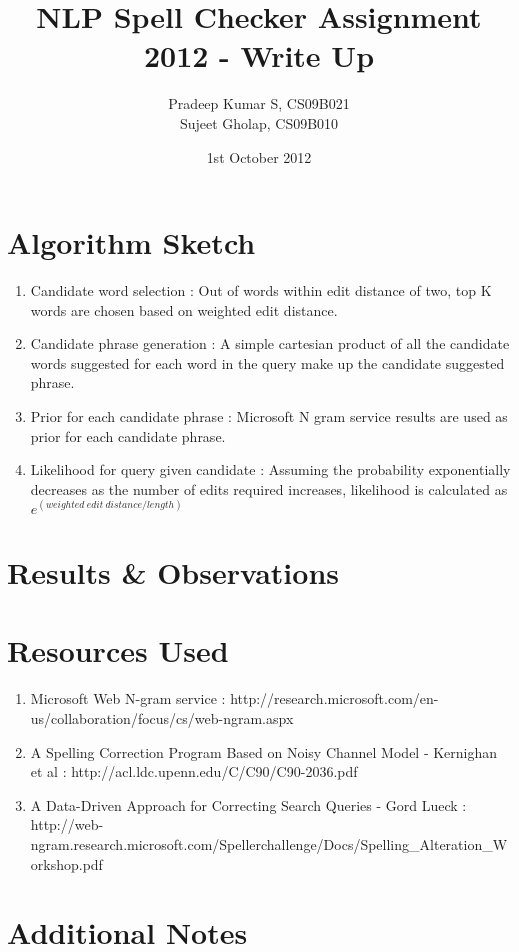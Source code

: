 \documentclass{article}
\title{NLP Spell Checker Assignment 2012 - Write Up}
\author{Pradeep Kumar S, CS09B021\\
Sujeet Gholap, CS09B010
}
\date{1st October 2012}
\begin{document}
\maketitle



\section{Algorithm Sketch}
\begin{enumerate}
\item Candidate word selection : Out of words within edit distance of two,
top K words are chosen based on weighted edit distance.
\item Candidate phrase generation : A simple cartesian product of all the
candidate words suggested for each word in the query make up the candidate
suggested phrase.
\item Prior for each candidate phrase : Microsoft N gram service results are
used as prior for each candidate phrase.
\item Likelihood for query given candidate : Assuming the probability
exponentially decreases as the number of edits required increases, likelihood
is calculated as $e^{(weighted\ edit\ distance / length)}$
\end{enumerate}


\section{Results \& Observations}


\section{Resources Used}
\begin{enumerate}
\item Microsoft Web N-gram service : http://research.microsoft.com/en-us/collaboration/focus/cs/web-ngram.aspx
\item A Spelling Correction Program Based on Noisy Channel Model - Kernighan
et al : http://acl.ldc.upenn.edu/C/C90/C90-2036.pdf
\item A Data-Driven Approach for Correcting Search Queries - Gord Lueck :
http://web-ngram.research.microsoft.com/Spellerchallenge/Docs/Spelling\_Alteration\_Workshop.pdf
\end{enumerate}

\section{Additional Notes}
\end{document}
